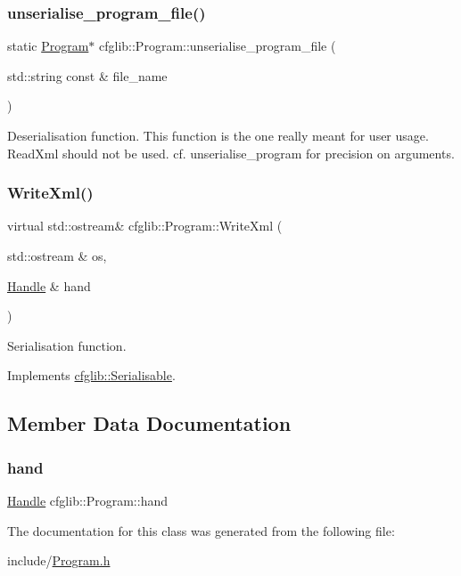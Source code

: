 \subsubsection{\texorpdfstring{unserialise\+\_\+program\+\_\+file()}{unserialise\_program\_file()}}
{\footnotesize\ttfamily static \hyperlink{classcfglib_1_1Program}{Program}$\ast$ cfglib\+::\+Program\+::unserialise\+\_\+program\+\_\+file (\begin{DoxyParamCaption}\item[{std\+::string const \&}]{file\+\_\+name }\end{DoxyParamCaption})\hspace{0.3cm}{\ttfamily [static]}}

Deserialisation function. This function is the one really meant for user usage. Read\+Xml should not be used. cf. unserialise\+\_\+program for precision on arguments. \mbox{\label{classcfglib_1_1Program_af18db304f16fea3e395fbeb7d6a7b358}} 
\subsubsection{\texorpdfstring{Write\+Xml()}{WriteXml()}}
{\footnotesize\ttfamily virtual std\+::ostream\& cfglib\+::\+Program\+::\+Write\+Xml (\begin{DoxyParamCaption}\item[{std\+::ostream \&}]{os,  }\item[{\hyperlink{classcfglib_1_1Handle}{Handle} \&}]{hand }\end{DoxyParamCaption})\hspace{0.3cm}{\ttfamily [virtual]}}

Serialisation function. 

Implements \hyperlink{classcfglib_1_1Serialisable_aaeb80cc7397ad312e5ae34f39412ce42}{cfglib\+::\+Serialisable}.



\subsection{Member Data Documentation}
\mbox{\label{classcfglib_1_1Program_a13cc0a03cdf31ab9cfa9a0a7b0dff8ed}} 
\subsubsection{\texorpdfstring{hand}{hand}}
{\footnotesize\ttfamily \hyperlink{classcfglib_1_1Handle}{Handle} cfglib\+::\+Program\+::hand}



The documentation for this class was generated from the following file\+:\begin{DoxyCompactItemize}
\item 
include/\hyperlink{Program_8h}{Program.\+h}\end{DoxyCompactItemize}
